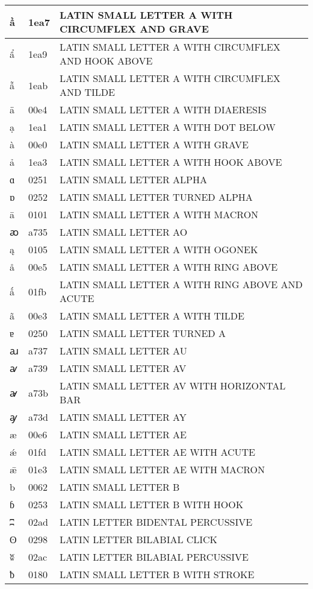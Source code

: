 \documentclass[12pt,letterpaper,openany]{book}
\begin{document}
\begin{center}
\begin{supertabular}{|m{0.25in}|m{0.5in}|m{4in}|}
ầ & 1ea7 & LATIN SMALL LETTER A WITH CIRCUMFLEX AND GRAVE\\\hline
ẩ & 1ea9 & LATIN \scriptsize SMALL LETTER A WITH CIRCUMFLEX AND HOOK ABOVE\\\hline
ẫ & 1eab & LATIN SMALL LETTER A WITH CIRCUMFLEX AND TILDE\\\hline
ä & 00e4 & LATIN SMALL LETTER A WITH DIAERESIS\\\hline
ạ & 1ea1 & LATIN SMALL LETTER A WITH DOT BELOW\\\hline
à & 00e0 & LATIN SMALL LETTER A WITH GRAVE\\\hline
ả & 1ea3 & LATIN SMALL LETTER A WITH HOOK ABOVE\\\hline
ɑ & 0251 & LATIN SMALL LETTER ALPHA\\\hline
ɒ & 0252 & LATIN SMALL LETTER TURNED ALPHA\\\hline
ā & 0101 & LATIN SMALL LETTER A WITH MACRON\\\hline
ꜵ & a735 & LATIN SMALL LETTER AO\\\hline
ą & 0105 & LATIN SMALL LETTER A WITH OGONEK\\\hline
å & 00e5 & LATIN SMALL LETTER A WITH RING ABOVE\\\hline
ǻ & 01fb & LATIN SMALL LETTER A WITH RING ABOVE AND ACUTE\\\hline
ã & 00e3 & LATIN SMALL LETTER A WITH TILDE\\\hline
ɐ & 0250 & LATIN SMALL LETTER TURNED A\\\hline
ꜷ & a737 & LATIN SMALL LETTER AU\\\hline
ꜹ & a739 & LATIN SMALL LETTER AV\\\hline
ꜻ & a73b & LATIN SMALL LETTER AV WITH HORIZONTAL BAR\\\hline
ꜽ & a73d & LATIN SMALL LETTER AY\\\hline
æ & 00e6 & LATIN SMALL LETTER AE\\\hline
ǽ & 01fd & LATIN SMALL LETTER AE WITH ACUTE\\\hline
ǣ & 01e3 & LATIN SMALL LETTER AE WITH MACRON\\\hline
b & 0062 & LATIN SMALL LETTER B\\\hline
ɓ & 0253 & LATIN SMALL LETTER B WITH HOOK\\\hline
ʭ & 02ad & LATIN LETTER BIDENTAL PERCUSSIVE\\\hline
ʘ & 0298 & LATIN LETTER BILABIAL CLICK\\\hline
ʬ & 02ac & LATIN LETTER BILABIAL PERCUSSIVE\\\hline
ƀ & 0180 & LATIN SMALL LETTER B WITH STROKE\\\hline

\end{supertabular}
\end{center}
\end{document}
